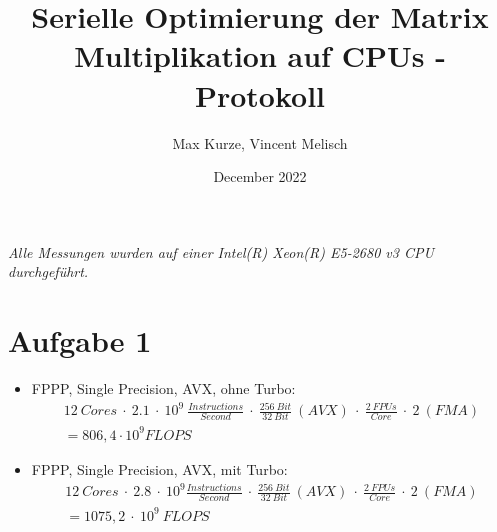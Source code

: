 \documentclass[a4paper]{article}
\title{Serielle Optimierung der Matrix Multiplikation auf CPUs - Protokoll}
\author{Max Kurze, Vincent Melisch}
\date{December 2022}
\begin{document}
\maketitle

\textit{Alle Messungen wurden auf einer Intel(R) Xeon(R) E5-2680 v3 CPU durchgeführt.}

\section*{Aufgabe 1}

\begin{itemize}
\item FPPP, Single Precision, AVX, ohne Turbo:
\begin{multline*}
12\ Cores\ \cdot\ 2.1\ \cdot\ 10^9\ \frac{Instructions}{Second}\ \cdot\ \frac{256\ Bit}{32\ Bit}\ (AVX)\ \cdot\ \frac{2\ FPUs}{Core}\ \cdot\ 2\ (FMA)\\
= 806,4 \cdot 10^9FLOPS
\end{multline*}

\item FPPP, Single Precision, AVX, mit Turbo:
\begin{multline*}
12~Cores ~\cdot~ 2.8 ~\cdot~ 10^{9} \frac{Instructions}{Second} ~\cdot~ \frac{256~Bit}{32~Bit}~(AVX) ~\cdot~ \frac{2~FPUs}{Core} ~\cdot~ 2~(FMA) \\ = 1075,2 ~\cdot~ 10^{9}~FLOPS
\end{multline*}
\end{itemize}
\end{document}
